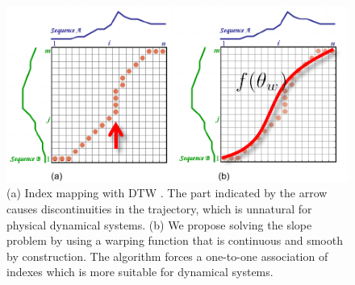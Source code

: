 \begin{figure} 
	\centering
	\includegraphics[scale=1.1, draft=false ]{./figures/dtwss.pdf} %
	\caption{
	(a) Index mapping with DTW \cite{dtw_webpage}. The part indicated by the arrow causes discontinuities in the trajectory, which is unnatural for physical dynamical systems.
	(b) We propose solving the slope problem by using a warping function that is continuous and smooth by construction. The algorithm forces a one-to-one association of indexes which is more suitable for dynamical systems.
	}
	\label{fig:dtwss}
\end{figure}

